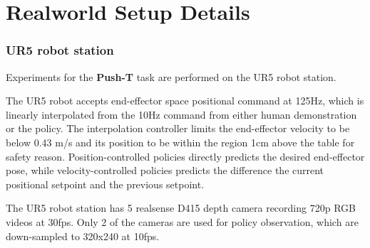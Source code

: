 \documentclass[Afour,sageh,times]{sagej}
\begin{document}



\section{Realworld Setup Details}

\subsubsection{UR5 robot station}
\label{sec:ur5_setup}
Experiments for the \textbf{Push-T} task are performed on the UR5 robot station. 

The UR5 robot accepts end-effector space positional command at 125Hz, which is linearly interpolated from the 10Hz command from either human demonstration or the policy. The interpolation controller limits the end-effector velocity to be below 0.43 m/s and its position to be within the region 1cm above the table for safety reason. Position-controlled policies directly predicts the desired end-effector pose, while velocity-controlled policies predicts the difference the current positional setpoint and the previous setpoint. 

The UR5 robot station has 5 realsense D415 depth camera recording 720p RGB videos at 30fps. Only 2 of the cameras are used for policy observation, which are down-sampled to 320x240 at 10fps.
\end{document}
